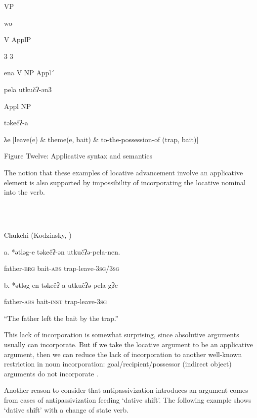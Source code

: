 \documentclass[output=paper,modfonts,nonflat]{langsci/langscibook}
\begin{document}
              VP  

    wo

               V               ApplP     

      3     3

           ena          V    NP          Appl´      

                          pela  utkučʔ-ən3

                                    Appl        NP

                  təkečʔ-a  

  λe [leave(e) \& theme(e, bait) \& to-the-possession-of (trap, bait)]

\begin{stylecaption}
Figure Twelve: Applicative syntax and semantics
\end{stylecaption}

The notion that these examples of locative advancement involve an applicative element is also supported by impossibility of incorporating the locative nominal into the verb.

\ea%
    \label{ex:key:12}
    \gll\\
        \\
    \glt
    \z

          Chukchi (Kodzinsky, \citealt{NedjalkovPolinskaja1988})

a.  *ətləg-e   təkečʔ-ən  utkučʔə-pela-nen.

  father{}-\textsc{erg}   bait-\textsc{abs}   trap-leave{}-3\textsc{sg}/3\textsc{sg}

b.    *ətləg-en   təkečʔ-a  utkučʔə-pela-gʔe

  father-\textsc{abs}  bait-\textsc{inst}  trap-leave-3\textsc{sg}

“The father left the bait by the trap.”

This lack of incorporation is somewhat surprising, since absolutive arguments usually can incorporate.  But if we take the locative argument to be an applicative argument, then we can reduce the lack of incorporation to another well-known restriction in noun incorporation: goal/recipient/possessor (indirect object) arguments do not incorporate \citep{Baker1988}.

Another reason to consider that antipassivization introduces an argument comes from cases of antipassivization feeding ‘dative shift’.  The following example shows ‘dative shift’ with a change of state verb.

\ea%
    \label{ex:key:13}
    \gll\\
        \\
    \glt
    \z
\end{document}
